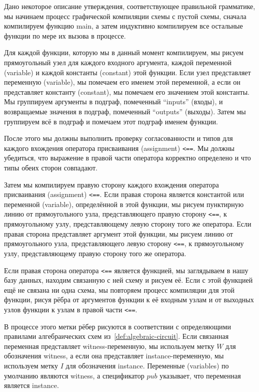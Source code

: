 Дано некоторое описание утверждения, соответствующее правильной грамматике, мы начинаем процесс графической компиляции схемы с пустой схемы, сначала компилируем функцию main, а затем индуктивно компилируем все остальные функции по мере их вызова в процессе.

Для каждой функции, которую мы в данный момент компилируем, мы рисуем прямоугольный узел для каждого входного аргумента, каждой переменной (variable) и каждой константы (constant) этой функции. Если узел представляет переменную (variable), мы помечаем его именем этой переменной, а если он представляет константу (constant), мы помечаем его значением этой константы. Мы группируем аргументы в подграф, помеченный ``inputs'' (входы), и возвращаемые значения в подграф, помеченный ``outputs'' (выходы). Затем мы группируем всё в подграф и помечаем этот подграф именем функции.

После этого мы должны выполнить проверку согласованности и типов для каждого вхождения оператора присваивания (assignment) \texttt{<==}. Мы должны убедиться, что выражение в правой части оператора корректно определено и что типы обеих сторон совпадают.

Затем мы компилируем правую сторону каждого вхождения оператора присваивания (assignment) \texttt{<==}. Если правая сторона является константой или переменной (variable), определённой в этой функции, мы рисуем пунктирную линию от прямоугольного узла, представляющего правую сторону \texttt{<==}, к прямоугольному узлу, представляющему левую сторону того же оператора. Если правая сторона представляет аргумент этой функции, мы рисуем линию от прямоугольного узла, представляющего левую сторону \texttt{<==}, к прямоугольному узлу, представляющему правую сторону того же оператора.

Если правая сторона оператора \texttt{<==} является функцией, мы заглядываем в нашу базу данных, находим связанную с ней схему и рисуем её. Если с этой функцией ещё не связана ни одна схема, мы повторяем процесс компиляции для этой функции, рисуя рёбра от аргументов функции к её входным узлам и от выходных узлов функции к узлам в правой части \texttt{<==}.

В процессе этого метки рёбер рисуются в соответствии с определяющими правилами алгебраических схем из~\ref{def:algebraic-circuit}. Если связанная переменная представляет witness-переменную, мы используем метку $W$ для обозначения witness, а если она представляет instance-переменную, мы используем метку $I$ для обозначения instance. Переменные (variables) по умолчанию являются witness, а спецификатор $pub$ указывает, что переменная является instance.


